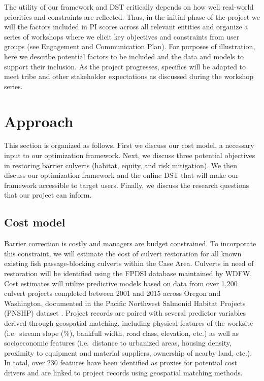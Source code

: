 The utility of our framework and DST critically depends on how well real-world priorities and constraints are reflected. Thus, in the initial phase of the project we will  the factors included in PI scores across all relevant entities and organize a series of workshops where we elicit key objectives and constraints from user groups (see Engagement and Communication Plan). For purposes of illustration, here we describe potential factors to be included and the data and models to support their inclusion. As the project progresses, specifics will be adapted to meet tribe and other stakeholder expectations as discussed during the workshop series.  

%
\section{Approach}


This section is organized as follows. First we discuss our cost model, a necessary input to our optimization framework. Next, we discuss three potential objectives in restoring barrier culverts (habitat, equity, and risk mitigation). We then discuss our optimization framework and the online DST that will make our framework accessible to target users. Finally, we discuss the research questions that our project can inform.

\subsection*{Cost model \label{sec:cost}}


Barrier correction is costly and managers are budget constrained. To incorporate this constraint, we will estimate the cost of culvert restoration for all known existing fish passage-blocking culverts within the Case Area. Culverts in need of restoration will be identified using the FPDSI database maintained by WDFW. Cost estimates will utilize predictive models based on data from over 1,200 culvert projects completed between 2001 and 2015 across Oregon and Washington, documented in the Pacific Northwest Salmonid Habitat Projects (PNSHP) dataset \citep{katz_freshwater_2007, noauthor_pacific_2021}. Project records are paired with several predictor variables derived through geospatial matching, including physical features of the worksite (i.e.\ stream slope (\%), bankfull width, road class, elevation, etc.) as well as socioeconomic features (i.e.\ distance to urbanized areas, housing density, proximity to equipment and material suppliers, ownership of nearby land, etc.). In total, over 230 features have been identified as proxies for potential cost drivers and are linked to project records using geospatial matching methods. 

